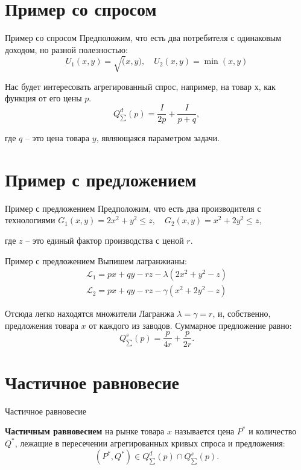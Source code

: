 \documentclass{beamer}
\begin{document}
\section{Пример со спросом}
\begin{frame}{Пример со спросом}
Предположим, что есть два потребителя с одинаковым доходом, но разной полезностью:
$$ U_1(x,y) = \sqrt(x,y), \quad U_2(x,y) = \min(x,y)$$

Нас будет интересовать агрегированный спрос, например, на товар $х$, как функция от его цены $p$.
$$ Q^d_{\sum}(p) = \frac{I}{2p} + \frac{I}{p + q}, $$

где $q$ – это цена товара $y$, являющаяся параметром задачи.
	
\end{frame}

\section{Пример с предложением}

\begin{frame}{Пример с предложением}
Предположим, что есть два производителя с технологиями
$G_1(x,y) = 2 x^2 + y^2 \leqslant z, \quad G_2(x,y) = x^2 + 2 y^2 \leqslant z,$

где $z$ – это единый фактор производства с ценой $r$.

\end{frame}

\begin{frame}{Пример с предложением}
Выпишем лагранжианы:
\begin{gather*}
\mathcal{L}_1 = px + qy - rz - \lambda(2x^2 + y^2 - z)\\
\mathcal{L}_2 = px + qy - rz - \gamma(x^2 + 2y^2 - z)
\end{gather*}

Отсюда легко находятся множители Лагранжа $\lambda = \gamma = r$, и, собственно, предложения товара $x$ от каждого из заводов. Суммарное предложение равно:
$$Q^s_{\sum}(p) = \frac{p}{4 r} + \frac{p}{2r}.$$
\end{frame}

\section{Частичное равновесие}
\begin{frame}{Частичное равновесие}

\begin{definition}
\textbf{Частичным равновесием} на рынке товара $x$ называется цена $P^{\ast}$ и количество $Q^{\ast}$, лежащие в пересечении агрегированных кривых спроса и предложения:
$$(P^{\ast},Q^{\ast}) \in Q^d_{\sum}(p) \cap Q^s_{\sum}(p).$$
\end{definition}
	
\end{frame}
\end{document}
